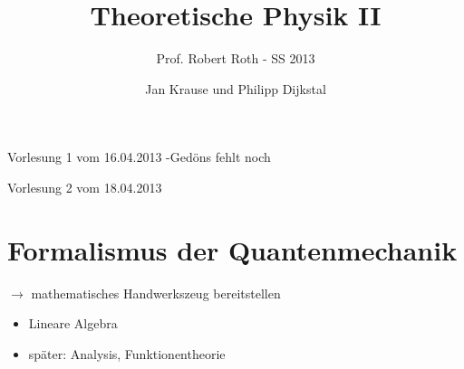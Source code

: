 \documentclass[10pt,article,colorback,accentcolor=tud9d]{scrartcl}
\title{Theoretische Physik II}
\subtitle{Prof. Robert Roth - SS 2013}
\author{Jan Krause und Philipp Dijkstal}
\begin{document}
\maketitle
\tableofcontents
\newpage
\noindent Vorlesung 1 vom 16.04.2013 -Gedöns fehlt noch\\
\begin{flushright}Vorlesung 2 vom 18.04.2013\end{flushright}
\section{Formalismus der Quantenmechanik}
$\rightarrow$ mathematisches Handwerkszeug bereitstellen\\
\begin{itemize}
\item Lineare Algebra
\item später: Analysis, Funktionentheorie
\end{itemize}
\end{document}
